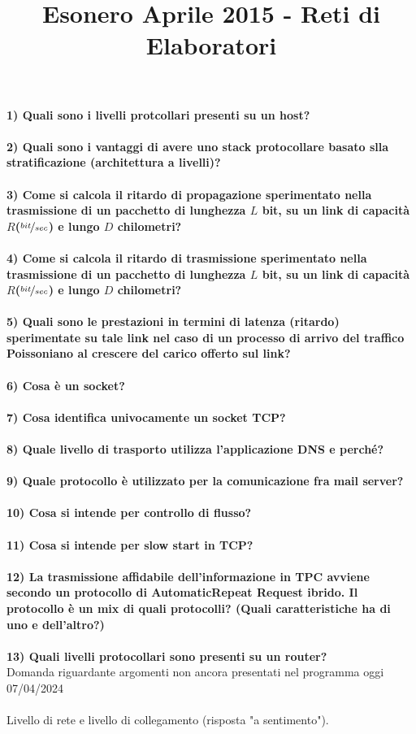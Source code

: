 \documentclass[12pt, letterpaper]{article}
\title{Esonero Aprile 2015 - Reti di Elaboratori}
\date{\vspace{-5ex}}
\newcommand{\acc}{\\\hphantom{}\\}
\begin{document}
\maketitle
\textbf{1) Quali sono i livelli protcollari presenti su un host?}\acc 



\textbf{2) Quali sono i vantaggi di avere uno stack protocollare basato slla stratificazione (architettura a livelli)?}\acc 



\textbf{3) Come si calcola il ritardo di propagazione sperimentato nella trasmissione di un pacchetto di lunghezza $L$ bit, su un link 
di capacità $R$($\nicefrac{bit}{sec}$) e lungo $D$ chilometri?}\acc 


\textbf{4) Come si calcola il ritardo di trasmissione sperimentato nella trasmissione di un pacchetto
di lunghezza $L$ bit, su un link di capacità $R$($\nicefrac{bit}{sec}$) e lungo $D$ chilometri?}\acc 


\textbf{5) Quali sono le prestazioni in termini di latenza (ritardo) sperimentate su tale link nel caso di un 
processo di arrivo del traffico Poissoniano al crescere del carico offerto sul link?}\acc 


\textbf{6) Cosa è un socket? }\acc 


\textbf{7) Cosa identifica univocamente un socket TCP?}\acc 


\textbf{8) Quale livello di trasporto utilizza l'applicazione DNS e perché?}\acc 



\textbf{9) Quale protocollo è utilizzato per la comunicazione fra mail server?}\acc 



\textbf{10) Cosa si intende per controllo di flusso?}\acc 



\textbf{11) Cosa si intende per slow start in TCP?}\acc 



\textbf{12) La trasmissione affidabile dell'informazione in TPC avviene secondo un protocollo di AutomaticRepeat Request ibrido.
 Il protocollo è un mix di quali protocolli? (Quali caratteristiche ha di uno e dell'altro?)}\acc 



 \textbf{13) Quali livelli protocollari sono presenti su un router?}\\
 \color{red}Domanda riguardante argomenti
 non ancora presentati 
 nel programma oggi 07/04/2024\color{black}\acc
 Livello di rete e livello di collegamento (risposta "a sentimento").\acc 
\end{document}
